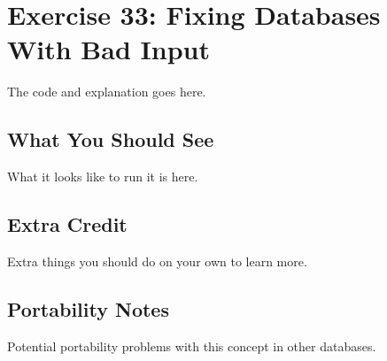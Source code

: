 \chapter{Exercise 33: Fixing Databases With Bad Input}


The code and explanation goes here.

\section{What You Should See}

What it looks like to run it is here.

\section{Extra Credit}

Extra things you should do on your own to learn more.

\section{Portability Notes}

Potential portability problems with this concept in other databases.

